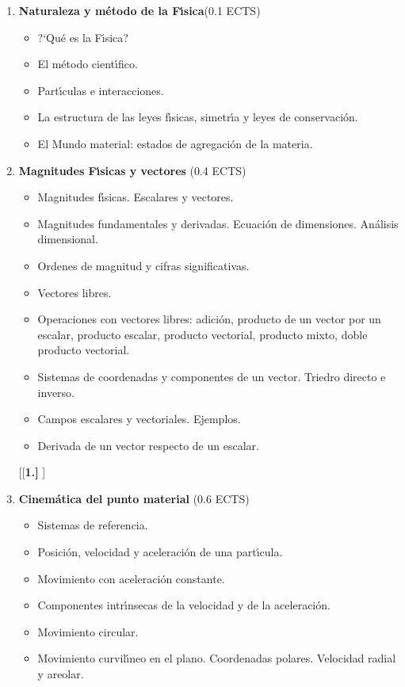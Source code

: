 
\begin{enumerate}[{\bf 1. }]
%
\item {\bf  Naturaleza y m\'{e}todo de la F\'{\i}sica}\hfill (0.1 ECTS)
\begin{itemize}\addtolength{\itemsep}{-0.25\baselineskip}
\noindent
\item  ?`Qu\'{e} es la F\'{\i}sica?
\item  El m\'{e}todo cient\'{\i}fico.
\item Part\'{\i}culas e interacciones. 
\item La estructura de las leyes f\'{\i}sicas, simetr\'{\i}a y leyes de conservaci\'{o}n. 
\item El Mundo material:  estados de agregaci\'{o}n de la materia.
\end{itemize}
%

\item {\bf  Magnitudes F\'{\i}sicas y vectores} \hfill    (0.4 ECTS)
\begin{itemize} \addtolength{\itemsep}{-0.25\baselineskip}
\noindent
\item   Magnitudes f\'{\i}sicas. Escalares y vectores.
\item  Magnitudes fundamentales y derivadas. Ecuaci\'{o}n de dimensiones.
 An\'{a}lisis dimensional.
\item  {O}rdenes de magnitud y cifras significativas.
\item Vectores libres.
\item Operaciones con vectores libres: adici\'{o}n, producto de un vector por 
un escalar, producto escalar, producto vectorial, producto mixto, 
 doble producto vectorial. 
\item Sistemas de coordenadas y componentes de un vector. 
Triedro directo e inverso.
\item Campos escalares y vectoriales. Ejemplos.
\item Derivada de un vector respecto de un escalar.
\end{itemize}
%



[{[\bf 1.] }]
\item {\bf Cinem\'{a}tica del punto material} \hfill (0.6 ECTS)
\begin{itemize} \addtolength{\itemsep}{-0.25\baselineskip}
\noindent
\item  Sistemas de referencia.
\item Posici\'{o}n, velocidad y aceleraci\'{o}n de una part\'{\i}cula.
\item Movimiento con aceleraci\'{o}n constante.
\item Componentes intr\'{\i}nsecas de la velocidad y de la aceleraci\'{o}n.
\item Movimiento circular.
\item Movimiento curvil\'{\i}neo en el plano. Coordenadas polares. Velocidad radial y areolar.
\end{itemize}
%


\end{enumerate}
